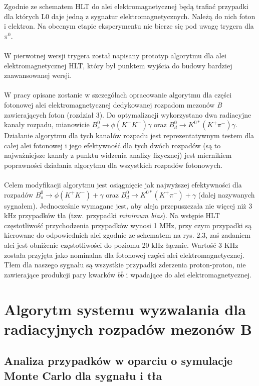 \documentclass{pracamgr}
\begin{document}
Zgodnie ze schematem HLT do alei elektromagnetycznej będą trafiać przypadki dla których L0 daje jedną z sygnatur elektromagnetycznych. Należą do nich foton i elektron. Na obecnym etapie eksperymentu nie bierze się pod uwagę trygera dla $\pi^0$.
\\\\
\noindent
W pierwotnej wersji trygera został napisany prototyp algorytmu dla alei elektromagnetycznej HLT, który był punktem wyjścia do budowy bardziej zaawansowanej wersji.
\\\\
\noindent
W pracy opisane zostanie w szczegółach opracowanie algorytmu dla części fotonowej alei elektromagnetycznej dedykowanej rozpadom mezonów \textit{B} zawierających foton (rozdział 3). Do optymalizacji wykorzystano dwa radiacyjne kanały rozpadu, mianowicie $B^{0}_{s}\rightarrow \phi(K^{+}K^{-})\gamma$ oraz $B^{0}_{d}\rightarrow K^{0*}(K^{+}\pi^{-})\gamma$. Działanie algorytmu dla tych kanałów rozpadu jest reprezentatywnym testem dla całej alei fotonowej i jego efektywność dla tych dwóch rozpadów (są to najważniejsze kanały z punktu widzenia analizy fizycznej) jest miernikiem poprawności działania algorytmu dla wszystkich rozpadów fotonowych.
\\\\
\noindent
Celem modyfikacji algorytmu jest osiągnięcie jak najwyższej efektywności dla rozpadów $B^{0}_{s}\rightarrow \phi(K^{+}K^{-}) + \gamma$ oraz $B^{0}_{d}\rightarrow K^{0*}(K^{+}\pi^{-}) + \gamma$ (dalej nazywanych sygnałem). Jednocześnie wymagane jest, aby aleja przepuszczała nie więcej niż 3 kHz przypadków tła (tzw. przypadki \textit{minimum bias}). Na wstępie HLT częstotliwość przychodzenia przypadków wynosi 1 MHz, przy czym przypadki są kierowane do odpowiednich alei zgodnie ze schematem na rys. 2.3, zaś zadaniem alei jest obniżenie częstotliwości do poziomu 20 kHz łącznie. Wartość 3 KHz została przyjęta jako nominalna dla fotonowej części alei elektromagnetycznej. Tłem dla naszego sygnału są wszystkie przypadki zderzenia proton-proton, nie zawierające produkcji pary kwarków $b\bar{b}$ i wpadające do alei elektromagnetycznej.

\chapter{Algorytm systemu wyzwalania dla radiacyjnych rozpadów mezonów B}
\section{Analiza przypadków w oparciu o symulacje Monte Carlo dla sygnału i tła}
\end{document}
